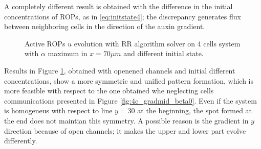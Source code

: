 A completely different result is obtained with the difference in the initial concentrations of ROPs, as in \eqref{eq:initstate4}; the discrepancy generates flux between neighboring cells in the direction of the auxin gradient.
\begin{figure}[t]
    \centering
    \quad
    \quad
    \quad
    \quad
    \caption[4cell RR Active ROPs - mid gradient, different initial state]{Active ROPs $u$ evolution with RR algorithm solver on 4 cells system with $\alpha$ maximum in $x = 70 \mu m$ and different initial state.}
    \label{fig:4c_gradmid_diffI}
\end{figure}
Results in Figure \ref{fig:4c_gradmid_diffI}, obtained with openened channels and initial different concentrations, show a more symmetric and unified pattern formation, which is more feasible with respect to the one obtained whe  neglecting cells communications presented in Figure \ref{fig:4c_gradmid_beta0}. Even if the system is homogeneus with respect to line $y = 30$ at the beginning, the spot formed at the end does not maintian this symmetry. A possible reason is the gradient in $y$ direction because of open channels; it makes the upper and lower part evolve differently.


